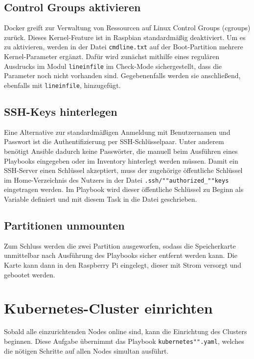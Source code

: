 \subsection{Control Groups aktivieren}\label{subsec:control-groups-aktivieren}

Docker greift zur Verwaltung von Ressourcen auf Linux Control Groups (cgroups) zurück.
Dieses Kernel-Feature ist in Raspbian standardmäßig deaktiviert.
Um es zu aktivieren, werden in der Datei \texttt{cmdline.txt} auf der Boot-Partition mehrere Kernel-Parameter ergänzt.
Dafür wird zunächst mithilfe eines regulären Ausdrucks im Modul \texttt{lineinfile} im Check-Mode sichergestellt, dass die Parameter noch nicht vorhanden sind.
Gegebenenfalls werden sie anschließend, ebenfalls mit \texttt{lineinfile}, hinzugefügt.

\subsection{SSH-Keys hinterlegen}\label{subsec:ssh-keys-hinterlegen}

Eine Alternative zur standardmäßigen Anmeldung mit Benutzernamen und Passwort ist die Authentifizierung per SSH-Schlüsselpaar.
Unter anderem benötigt Ansible dadurch keine Passwörter, die manuell beim Ausführen eines Playbooks eingegeben oder im Inventory hinterlegt werden müssen.
Damit ein SSH-Server einen Schlüssel akzeptiert, muss der zugehörige öffentliche Schlüssel im Home-Verzeichnis des Nutzers in der Datei \texttt{.ssh/""authorized\_""keys} eingetragen werden.
Im Playbook wird dieser öffentliche Schlüssel zu Beginn als Variable definiert und mit diesem Task in die Datei geschrieben.

\subsection{Partitionen unmounten}\label{subsec:partitionen-unmounten}

Zum Schluss werden die zwei Partition ausgeworfen, sodass die Speicherkarte unmittelbar nach Ausführung des Playbooks sicher entfernt werden kann.
Die Karte kann dann in den Raspberry Pi eingelegt, dieser mit Strom versorgt und gebootet werden.

\section{Kubernetes-Cluster einrichten}

Sobald alle einzurichtenden Nodes online sind, kann die Einrichtung des Clusters beginnen.
Diese Aufgabe übernimmt das Playbook \texttt{kubernetes"".yaml}, welches die nötigen Schritte auf allen Nodes simultan ausführt.

